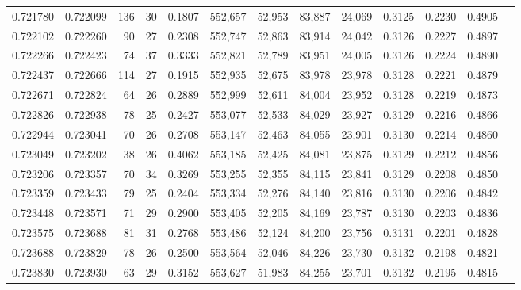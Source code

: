 \begin{tabular}{rrrrrrrrrrrrr}
0.721780 & 0.722099 &   136 &  30 &                                     0.1807 & 552,657 &  52,953 &  83,887 &  24,069 & 0.3125 & 0.2230 & 0.4905 \\
0.722102 & 0.722260 &    90 &  27 &                                     0.2308 & 552,747 &  52,863 &  83,914 &  24,042 & 0.3126 & 0.2227 & 0.4897 \\
0.722266 & 0.722423 &    74 &  37 &                                     0.3333 & 552,821 &  52,789 &  83,951 &  24,005 & 0.3126 & 0.2224 & 0.4890 \\
0.722437 & 0.722666 &   114 &  27 &                                     0.1915 & 552,935 &  52,675 &  83,978 &  23,978 & 0.3128 & 0.2221 & 0.4879 \\
0.722671 & 0.722824 &    64 &  26 &                                     0.2889 & 552,999 &  52,611 &  84,004 &  23,952 & 0.3128 & 0.2219 & 0.4873 \\
0.722826 & 0.722938 &    78 &  25 &                                     0.2427 & 553,077 &  52,533 &  84,029 &  23,927 & 0.3129 & 0.2216 & 0.4866 \\
0.722944 & 0.723041 &    70 &  26 &                                     0.2708 & 553,147 &  52,463 &  84,055 &  23,901 & 0.3130 & 0.2214 & 0.4860 \\
0.723049 & 0.723202 &    38 &  26 &                                     0.4062 & 553,185 &  52,425 &  84,081 &  23,875 & 0.3129 & 0.2212 & 0.4856 \\
0.723206 & 0.723357 &    70 &  34 &                                     0.3269 & 553,255 &  52,355 &  84,115 &  23,841 & 0.3129 & 0.2208 & 0.4850 \\
0.723359 & 0.723433 &    79 &  25 &                                     0.2404 & 553,334 &  52,276 &  84,140 &  23,816 & 0.3130 & 0.2206 & 0.4842 \\
0.723448 & 0.723571 &    71 &  29 &                                     0.2900 & 553,405 &  52,205 &  84,169 &  23,787 & 0.3130 & 0.2203 & 0.4836 \\
0.723575 & 0.723688 &    81 &  31 &                                     0.2768 & 553,486 &  52,124 &  84,200 &  23,756 & 0.3131 & 0.2201 & 0.4828 \\
0.723688 & 0.723829 &    78 &  26 &                                     0.2500 & 553,564 &  52,046 &  84,226 &  23,730 & 0.3132 & 0.2198 & 0.4821 \\
0.723830 & 0.723930 &    63 &  29 &                                     0.3152 & 553,627 &  51,983 &  84,255 &  23,701 & 0.3132 & 0.2195 & 0.4815 \\

\end{tabular}
